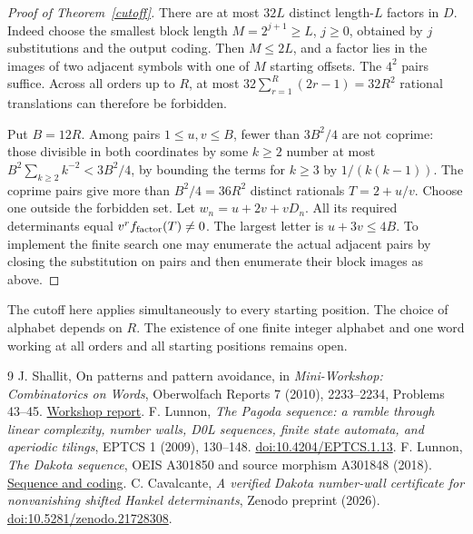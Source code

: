 \documentclass[11pt]{article}
\begin{document}
\begin{proof}[Proof of Theorem~\ref{cutoff}]
There are at most $32L$ distinct length-$L$ factors in $D$. Indeed choose the smallest block length $M=2^{j+1}\ge L$, $j\ge0$, obtained by $j$ substitutions and the output coding. Then $M\le2L$, and a factor lies in the images of two adjacent symbols with one of $M$ starting offsets. The $4^2$ pairs suffice. Across all orders up to $R$, at most $32\sum_{r=1}^R(2r-1)=32R^2$ rational translations can therefore be forbidden.

Put $B=12R$. Among pairs $1\le u,v\le B$, fewer than $3B^2/4$ are not coprime: those divisible in both coordinates by some $k\ge2$ number at most $B^2\sum_{k\ge2}k^{-2}<3B^2/4$, by bounding the terms for $k\ge3$ by $1/(k(k-1))$. The coprime pairs give more than $B^2/4=36R^2$ distinct rationals $T=2+u/v$. Choose one outside the forbidden set. Let $w_n=u+2v+vD_n$. All its required determinants equal $v^r f_{\rm factor}(T)\ne0$. The largest letter is $u+3v\le4B$. To implement the finite search one may enumerate the actual adjacent pairs by closing the substitution on pairs and then enumerate their block images as above.
\end{proof}
The cutoff here applies simultaneously to every starting position. The choice of alphabet depends on $R$. The existence of one finite integer alphabet and one word working at all orders and all starting positions remains open.

\begin{thebibliography}{9}
 J. Shallit, On patterns and pattern avoidance, in \emph{Mini-Workshop: Combinatorics on Words}, Oberwolfach Reports 7 (2010), 2233--2234, Problems 43--45. \href{https://doi.org/10.4171/OWR/2010/37}{Workshop report}.
 F. Lunnon, \emph{The Pagoda sequence: a ramble through linear complexity, number walls, D0L sequences, finite state automata, and aperiodic tilings}, EPTCS 1 (2009), 130--148. \href{https://doi.org/10.4204/EPTCS.1.13}{doi:10.4204/EPTCS.1.13}.
 F. Lunnon, \emph{The Dakota sequence}, OEIS A301850 and source morphism A301848 (2018). \href{https://oeis.org/A301850}{Sequence and coding}.
 C. Cavalcante, \emph{A verified Dakota number-wall certificate for nonvanishing shifted Hankel determinants}, Zenodo preprint (2026). \href{https://doi.org/10.5281/zenodo.21728308}{doi:10.5281/zenodo.21728308}.
\end{thebibliography}
\end{document}
